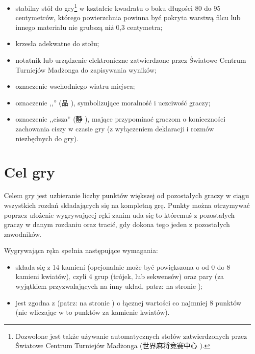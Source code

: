 \begin{itemize}
  oznaczona kropkami w liczbie od 1 do 6, przy czym ściany z 1 i 4 kropkami mają
  oznaczenia czerwone, podczas gdy pozostałe oznaczone są kropkami niebieskimi
  lub czarnymi;
  \item stabilny stół do gry\footnote{Dozwolone jest także używanie
  automatycznych stołów zatwierdzonych przez Światowe Centrum Turniejów
  Madżonga (世界麻将竞赛中心 ).} w kształcie
  kwadratu o boku długości 80 do 95 centymetrów, którego powierzchnia powinna
  być pokryta warstwą filcu lub innego materiału nie grubszą niż 0,3 centymetra;
  \item krzesła adekwatne do stołu;
  \item notatnik lub urządzenie elektroniczne zatwierdzone przez Światowe
  Centrum Turniejów Madżonga do zapisywania wyników;
  \item oznaczenie wschodniego wiatru miejsca;
  \item oznaczenie ,,'' (品 ), symbolizujące moralność i
  uczciwość graczy;
  \item oznaczenie ,,cisza'' (静 ), mające przypominać graczom o
  konieczności zachowania ciszy w czasie gry (z wyłączeniem deklaracji i rozmów
  niezbędnych do gry).
\end{itemize}

\section{Cel gry}
Celem gry jest uzbieranie liczby punktów większej od pozostałych graczy
w ciągu wszystkich rozdań składających się na kompletną grę. Punkty
można otrzymywać poprzez ułożenie wygrywającej ręki zanim uda się to któremuś z
pozostałych graczy w danym rozdaniu oraz tracić, gdy dokona tego jeden z
pozostałych zawodników.

\label{wygrywajacareka}
Wygrywająca ręka spełnia następujące wymagania:
\begin{itemize}
  \item składa się z 14 kamieni (opcjonalnie może być powiększona o od 0 do 8
  kamieni kwiatów), czyli 4 grup (trójek,  lub sekwensów) oraz
  pary (za wyjątkiem  przyzwalających na inny układ, patrz:
   na stronie \pageref{fan});
  \item jest zgodna z  (patrz:  na stronie
  \pageref{fan}) o łącznej wartości co najmniej 8 punktów (nie wliczając w to
  punktów za kamienie kwiatów).
\end{itemize}

